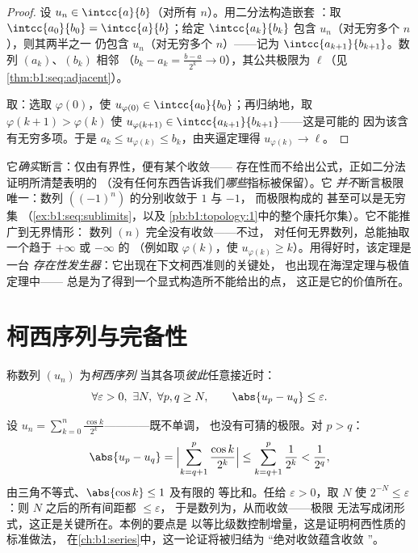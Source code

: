 \begin{proof}
设 $u_n \in \intcc{a}{b}$（对所有 $n$）。用二分法构造嵌套
：取 $\intcc{a_0}{b_0} = \intcc{a}{b}$；给定
$\intcc{a_k}{b_k}$ 包含 $u_n$（对无穷多个 $n$），则其两半之一
仍包含 $u_n$（对无穷多个 $n$）——记为
$\intcc{a_{k+1}}{b_{k+1}}$。数列 $(a_k)$、$(b_k)$ 相邻
（$b_k - a_k = \frac{b-a}{2^k} \to 0$），其公共极限为
$\ell$（见\cref{thm:b1:seq:adjacent}）。

取：选取 $\varphi(0)$，使 $u_{\varphi(0)} \in
\intcc{a_0}{b_0}$；再归纳地，取 $\varphi(k+1) > \varphi(k)$
使 $u_{\varphi(k+1)} \in \intcc{a_{k+1}}{b_{k+1}}$——这是可能的
因为该含有无穷多项。于是 $a_k \leq
u_{\varphi(k)} \leq b_k$，由夹逼定理得
$u_{\varphi(k)} \to \ell$。
\end{proof}

\begin{remark}
它\emph{确实}断言：仅由有界性，便有某个收敛——
存在性而不给出公式，正如二分法证明所清楚表明的
（没有任何东西告诉我们\emph{哪些}指标被保留）。它
\emph{并不}断言极限唯一：数列 $((-1)^n)$ 的分别收敛于 $1$ 与 $-1$，
而极限构成的
甚至可以是无穷集
（\cref{ex:b1:seq:sublimits}，以及
\cref{pb:b1:topology:1}中的整个康托尔集）。它不能推广到无界情形：
数列 $(n)$ 完全没有收敛——不过，
对任何无界数列，总能抽取一个趋于 $+\infty$ 或 $-\infty$ 的
（例如取 $\varphi(k)$，使
$u_{\varphi(k)} \geq k$）。用得好时，该定理是一台
\emph{存在性发生器}：它出现在下文柯西准则的关键处，
也出现在海涅定理与极值定理中——
总是为了得到一个显式构造所不能给出的点，
这正是它的价值所在。
\end{remark}

\section{柯西序列与完备性}

\begin{definition}\label{def:b1:seq:cauchy}
称数列 $(u_n)$ 为\emph{柯西序列}
当其各项\emph{彼此}任意接近时：
\[
\forall \varepsilon > 0,\ \exists N,\ \forall p, q \geq N,
\qquad \abs{u_p - u_q} \leq \varepsilon .
\]
\end{definition}

\begin{example}[用手算验证柯西性质]\label{ex:b1:seq:cauchyhand}
设 $u_n = \sum_{k=0}^{n} \frac{\cos k}{2^k}$————既不单调，
也没有可猜的极限。对 $p > q$：
\[
\abs{u_p - u_q}
= \Bigl| \sum_{k=q+1}^{p} \frac{\cos k}{2^k} \Bigr|
\leq \sum_{k=q+1}^{p} \frac{1}{2^k}
< \frac{1}{2^{q}} ,
\]
由三角不等式、$\abs{\cos k} \leq 1$ 及有限的
等比和。任给 $\varepsilon > 0$，取 $N$ 使 $2^{-N}
\leq \varepsilon$：则 $N$ 之后的所有间距都 $\leq \varepsilon$，
于是数列为，从而收敛——极限
无法写成闭形式，这正是关键所在。本例的要点是
以等比级数控制增量，这是证明柯西性质的标准做法，
在\cref{ch:b1:series}中，这一论证将被归结为
“绝对收敛蕴含收敛
”。
\end{example}


